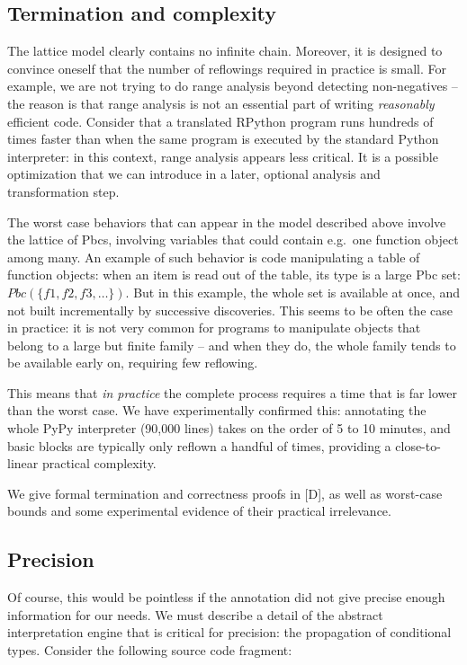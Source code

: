 \documentclass{acm_proc_article-sp}
\begin{document}
\subsection{Termination and complexity}

The lattice model clearly contains no infinite chain.  Moreover, it is
designed to convince oneself that the number of reflowings required in
practice is small.  For example, we are not trying to do range analysis
beyond detecting non-negatives -- the reason is that range analysis is
not an essential part of writing \textit{reasonably} efficient code.  Consider
that a translated RPython program runs hundreds of times faster than
when the same program is executed by the standard Python interpreter: in
this context, range analysis appears less critical.  It is a possible
optimization that we can introduce in a later, optional analysis and
transformation step.

The worst case behaviors that can appear in the model described above
involve the lattice of Pbcs, involving variables that could contain
e.g.\ one function object among many.  An example of such behavior is
code manipulating a table of function objects: when an item is read
out of the table, its type is a large Pbc set: $Pbc(\{f1, f2, f3,
\ldots\})$.  But in this example, the whole set is available at once,
and not built incrementally by successive discoveries.  This seems to
be often the case in practice: it is not very common for programs to
manipulate objects that belong to a large but finite family -- and when
they do, the whole family tends to be available early on, requiring
few reflowing.

This means that \textit{in practice} the complete process requires a time that
is far lower than the worst case.  We have experimentally confirmed
this: annotating the whole PyPy interpreter (90,000 lines) takes on the
order of 5 to 10 minutes, and basic blocks are typically only reflown a
handful of times, providing a close-to-linear practical complexity.

We give formal termination and correctness proofs in [D], as well as
worst-case bounds and some experimental evidence of their practical
irrelevance.


\subsection{Precision}

Of course, this would be pointless if the annotation did not give
precise enough information for our needs.  We must describe a detail of
the abstract interpretation engine that is critical for precision: the
propagation of conditional types.  Consider the following source code
fragment:
\end{document}
